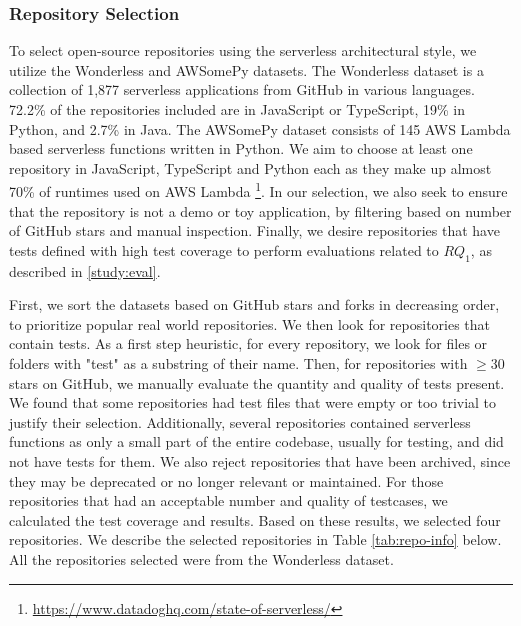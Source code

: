 
\subsubsection{Repository Selection}
To select open-source repositories using the serverless architectural style, we utilize the Wonderless \cite{eskandani2021wonderless} and AWSomePy \cite{giuseppe_awsomepy} datasets. The Wonderless dataset is a collection of 1,877 serverless applications from GitHub in various languages. 72.2\% of the repositories included are in JavaScript or TypeScript, 19\% in Python, and 2.7\% in Java. The AWSomePy dataset consists of 145 AWS Lambda based serverless functions written in Python. We aim to choose at least one repository in JavaScript, TypeScript and Python each as they make up almost 70\% of runtimes used on AWS Lambda \footnote{\url{https://www.datadoghq.com/state-of-serverless/}}. In our selection, we also seek to ensure that the repository is not a demo or toy application, by filtering based on number of GitHub stars and manual inspection. Finally, we desire repositories that have tests defined with high test coverage to perform evaluations related to $RQ_{1}$, as described in \ref{study:eval}. 

First, we sort the datasets based on GitHub stars and forks in decreasing order, to prioritize popular real world repositories. We then look for repositories that contain tests. As a first step heuristic, for every repository, we look for files or folders with "test" as a substring of their name. Then, for repositories with $\geq 30$ stars on GitHub, we manually evaluate the quantity and quality of tests present. We found that some repositories had test files that were empty or too trivial to justify their selection. Additionally, several repositories contained serverless functions as only a small part of the entire codebase, usually for testing, and did not have tests for them. We also reject repositories that have been archived, since they may be deprecated or no longer relevant or maintained. For those repositories that had an acceptable number and quality of testcases, we calculated the test coverage and results. Based on these results, we selected four repositories.
We describe the selected repositories in Table \ref{tab:repo-info} below. All the repositories selected were from the Wonderless dataset.


